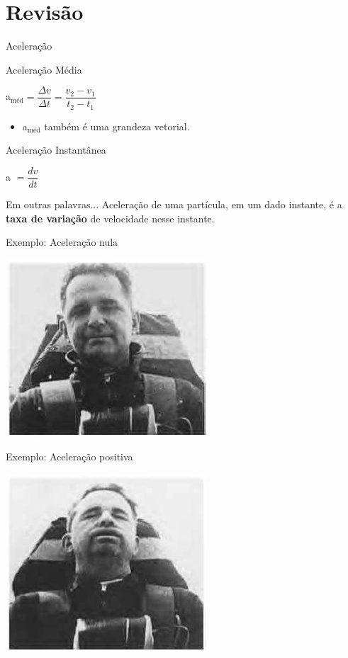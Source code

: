 \documentclass[xcolor=dvipsnames,table]{beamer}
\begin{document}
	\section{Revisão}
	\begin{frame}{Aceleração}
		\begin{block}{Aceleração Média}
			\begin{center}
				a$_{\mbox{méd}} = \dfrac{\Delta v}{\Delta t} = \dfrac{v_2 - v_1}{t_2 - t_1}$
			\end{center} 
			\begin{itemize}
				\item a$_{\mbox{méd}}$ também é uma grandeza vetorial.
			\end{itemize}
		\end{block} 
		\begin{block}{Aceleração Instantânea}
			\begin{center}
				a $= \dfrac{d v}{d t}$
			\end{center}
		\end{block} 
		\begin{block}{Em outras palavras...}
			Aceleração de uma partícula, em um dado instante, é a {\bf taxa de variação} de velocidade nesse instante.
		\end{block}
	\end{frame}

	\begin{frame}{Exemplo: Aceleração nula}
		\begin{center}
			\includegraphics[scale=0.8]{images/fig2-7a}
		\end{center}
	\end{frame}

	\begin{frame}{Exemplo: Aceleração positiva}
		\begin{center}
			\includegraphics[scale=0.8]{images/fig2-7b}
		\end{center}
	\end{frame}
\end{document}
